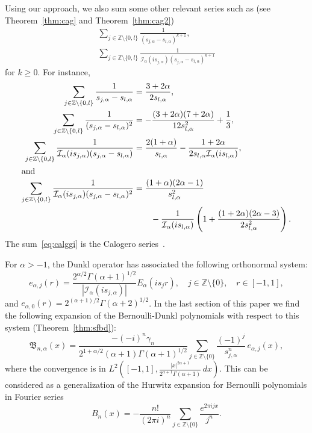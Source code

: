 \documentclass[10pt,a4paper]{article}
\theoremstyle{plain}
\theoremstyle{definition}
\numberwithin{equation}{section} %
\newcommand{\Ea}{E_{\alpha}}
\newcommand{\I}{\mathcal{I}}
\newcommand{\B}{\mathfrak{B}}
\newcommand{\ZZ}{\mathbb{Z}}
\newcommand{\ZZO}{\mathbb{Z} \setminus \{0\}}
\newcommand{\cc}{\gamma}
\begin{document}
Using our approach, we also sum some other relevant series such as (see Theorem~\ref{thm:cag} and Theorem~\ref{thm:cag2})
\begin{gather*}
  \sum_{j\in \ZZ\setminus\{0,l\}} \frac{1}{(s_{j,\alpha}-s_{l,\alpha})^{k+1}},\\
  \sum_{j\in \ZZ\setminus\{0,l\}} \frac{1}{\I_\alpha(is_{j,\alpha})(s_{j,\alpha}-s_{l,\alpha})^{k+1}}
\end{gather*}
for $k\ge 0$. For instance,
\begin{align}
\label{eq:calggi}
  \sum_{j\in \ZZ\setminus\{0,l\}} \frac{1}{s_{j,\alpha}-s_{l,\alpha}}
  &= \frac{3+2\alpha}{2s_{l,\alpha}},\\
\nonumber
  \sum_{j\in \ZZ\setminus\{0,l\}} \frac{1}{(s_{j,\alpha}-s_{l,\alpha})^{2}}
  &= -\frac{(3+2\alpha)(7+2\alpha)}{12s_{l,\alpha}^2}+\frac{1}{3},\\
\nonumber
  \sum_{j\in \ZZ\setminus\{0,l\}} \frac{1}{\I_\alpha(is_{j,\alpha})(s_{j,\alpha}-s_{l,\alpha})}
  &= \frac{2(1+\alpha)}{s_{l,\alpha}} - \frac{1+2\alpha}{2s_{l,\alpha}\I_\alpha(is_{l,\alpha})},\\
\intertext{and}
\nonumber
  \sum_{j\in \ZZ\setminus\{0,l\}} \frac{1}{\I_\alpha(is_{j,\alpha})(s_{j,\alpha}-s_{l,\alpha})^{2}}
  &= \frac{(1+\alpha)(2\alpha-1)}{s_{l,\alpha}^2} \\
\nonumber
  &\qquad- \frac{1}{\I_\alpha(is_{l,\alpha})}
  \left( 1+\frac{(1+2\alpha)(2\alpha-3)}{2s_{l,\alpha}^2}\right).
\end{align}
The sum~\eqref{eq:calggi} is the Calogero series~\cite{Cal}.

For $\alpha >-1$, the Dunkl operator has associated the following orthonormal system:
\[
  e_{\alpha,j}(r) = \frac{2^{\alpha/2}\Gamma(\alpha+1)^{1/2}}
    {|\I_{\alpha}(is_{j,\alpha})|} \Ea(is_j r),
  \quad j\in \ZZO, \quad r \in [-1,1],
\]
and $e_{\alpha,0}(r) = 2^{(\alpha+1)/2}\Gamma(\alpha+2)^{1/2}$.
In the last section of this paper we find the following expansion of the Bernoulli-Dunkl polynomials with respect to this system (Theorem~\ref{thm:sfbd}):
\[
  \B_{n,\alpha}(x) = \frac{-(-i)^n\cc_n}{2^{1+\alpha/2}(\alpha+1)\Gamma(\alpha+1)^{1/2}}
  \sum_{j\in \ZZO} \frac{(-1)^j}{s_{j,\alpha}^n} \, e_{\alpha,j}(x),
\]
where the convergence is in $L^2\left( [-1,1],\tfrac{|x|^{2\alpha+1}}{2^{\alpha+1}\Gamma(\alpha+1)}\,dx\right)$.
This can be considered as a generalization of the Hurwitz expansion for Bernoulli polynomials in Fourier series
\[
  B_n(x) = -\frac{n!}{(2\pi i)^n} \sum_{j\in \ZZO}\frac{e^{2\pi i jx}}{j^n}.
\]
\end{document}
